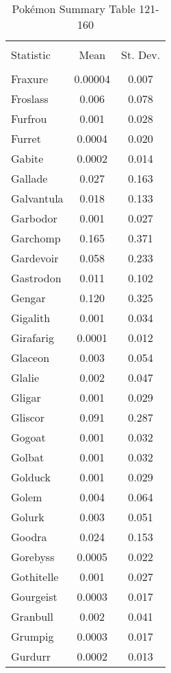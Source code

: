\documentclass[12pt,twoside]{reedthesis}
\begin{document}
  \begin{table}[!htbp] \centering 
    \caption{Pokémon Summary Table 121-160} 
    \label{} 
  \begin{tabular}{@{\extracolsep{5pt}}lcc} 
  \\[-1.8ex]\hline 
  \hline \\[-1.8ex] 
  Statistic & \multicolumn{1}{c}{Mean} & \multicolumn{1}{c}{St. Dev.} \\ 
  \hline \\[-1.8ex] 
  Fraxure & 0.00004 & 0.007 \\ 
  Froslass & 0.006 & 0.078 \\ 
  Furfrou & 0.001 & 0.028 \\ 
  Furret & 0.0004 & 0.020 \\ 
  Gabite & 0.0002 & 0.014 \\ 
  Gallade & 0.027 & 0.163 \\ 
  Galvantula & 0.018 & 0.133 \\ 
  Garbodor & 0.001 & 0.027 \\ 
  Garchomp & 0.165 & 0.371 \\ 
  Gardevoir & 0.058 & 0.233 \\ 
  Gastrodon & 0.011 & 0.102 \\ 
  Gengar & 0.120 & 0.325 \\ 
  Gigalith & 0.001 & 0.034 \\ 
  Girafarig & 0.0001 & 0.012 \\ 
  Glaceon & 0.003 & 0.054 \\ 
  Glalie & 0.002 & 0.047 \\ 
  Gligar & 0.001 & 0.029 \\ 
  Gliscor & 0.091 & 0.287 \\ 
  Gogoat & 0.001 & 0.032 \\ 
  Golbat & 0.001 & 0.032 \\ 
  Golduck & 0.001 & 0.029 \\ 
  Golem & 0.004 & 0.064 \\ 
  Golurk & 0.003 & 0.051 \\ 
  Goodra & 0.024 & 0.153 \\ 
  Gorebyss & 0.0005 & 0.022 \\ 
  Gothitelle & 0.001 & 0.027 \\ 
  Gourgeist & 0.0003 & 0.017 \\ 
  Granbull & 0.002 & 0.041 \\ 
  Grumpig & 0.0003 & 0.017 \\ 
  Gurdurr & 0.0002 & 0.013 \\ 

\end{tabular}
\end{table}
\end{document}
